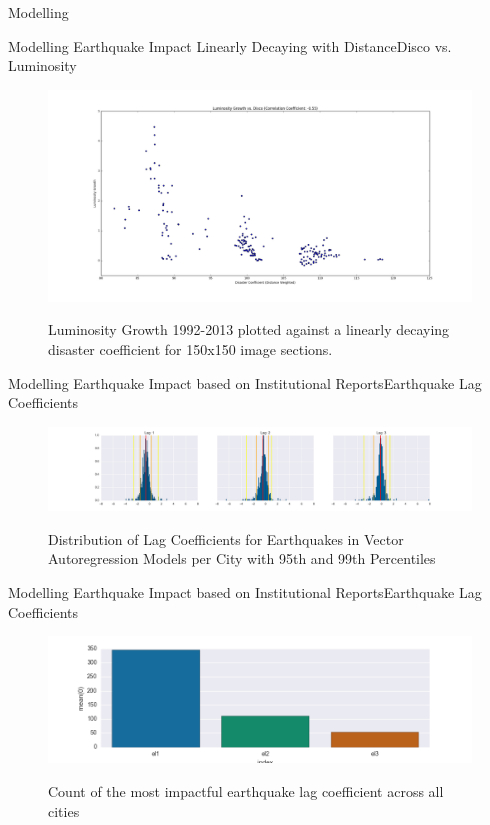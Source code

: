 \documentclass{beamer}
\begin{document}
\begin{section}{Modelling}
  \begin{frame}{Modelling Earthquake Impact Linearly Decaying with Distance}{Disco vs. Luminosity}
    \begin{figure}
      \centering
      \includegraphics[width=1\linewidth]{linear-lum-vs-disco}\label{fig:linear-model-disco-vs-lum-growth} %
      \caption{Luminosity Growth 1992-2013 plotted against a linearly decaying disaster coefficient for 150x150 image sections.}
    \end{figure}
  \end{frame}

  \begin{frame}{Modelling Earthquake Impact based on Institutional Reports}{Earthquake Lag Coefficients}
    \begin{figure}
      \centering
      \includegraphics[width=\linewidth]{non_balanced_earthquake_coefficients_distribution}\label{fig:non_balanced_earthquake_coefficients_distribution}
      \caption{Distribution of Lag Coefficients for Earthquakes in Vector Autoregression Models per City with 95th and 99th Percentiles}
    \end{figure}
  \end{frame}

  \begin{frame}{Modelling Earthquake Impact based on Institutional Reports}{Earthquake Lag Coefficients}
    \begin{figure}
      \centering
      \includegraphics[width=\linewidth]{non_balanced_earthquake_coefficients_winning_lag}\label{fig:non_balanced_earthquake_winning_lag}
      \caption{Count of the most impactful earthquake lag coefficient across all cities}
    \end{figure}
  \end{frame}


\end{section}
\end{document}

